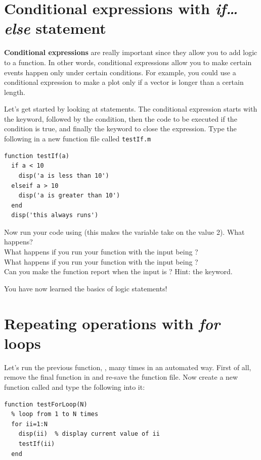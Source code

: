 \documentclass{article}
\begin{document}
\pagebreak
\section{Conditional expressions with \emph{if\dots else} statement}

\textbf{Conditional expressions} are really important since they allow you to add logic to a function.
In other words, conditional expressions allow you to make certain events happen only under certain conditions.
For example, you could use a conditional expression to make a plot only if a vector is longer than a certain length.

Let's get started by looking at  statements.
The conditional expression starts with the  keyword, followed by the condition, then the code to be executed if the condition is true, and finally the  keyword to close the expression.
Type the following in a new function file called \texttt{testIf.m}
\begin{lstlisting}
function testIf(a)
  if a < 10
    disp('a is less than 10')
  elseif a > 10
  	disp('a is greater than 10')
  end
  disp('this always runs')
\end{lstlisting}

Now run your code using  (this makes the variable  take on the value 2).
What happens? \\
What happens if you run your function with the input being ?\\
What happens if you run your function with the input being ?\\
Can you make the function report when the input is ? Hint: the  keyword.

You have now learned the basics of logic statements!


\pagebreak
\section{Repeating operations with \emph{for} loops}

Let's run the previous function, , many times in an automated way.
First of all, remove the final  function in  and re-save the function file.
Now create a new function called  and type the following into it:

\begin{lstlisting}
function testForLoop(N)
  % loop from 1 to N times
  for ii=1:N
    disp(ii)  % display current value of ii
    testIf(ii)
  end

\end{lstlisting}
\end{document}

